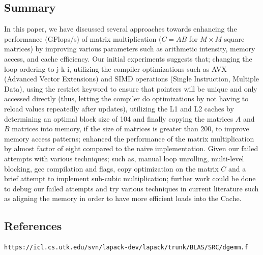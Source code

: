 \documentclass[12pt]{article}
\begin{document}
\subsection{Summary}

In this paper, we have discussed several approaches towards enhancing the performance (GFlops/s) of matrix multiplication ($C = AB$ for $M \times M$ square matrices) by improving various parameters such as arithmetic intensity, memory access, and cache efficiency. Our initial experiments suggests that; changing the loop ordering to j-k-i, utilizing the compiler optimizations such as AVX (Advanced Vector Extensions) and SIMD operations (Single Instruction, Multiple Data), using the restrict keyword to ensure that pointers will be unique and only accessed directly (thus, letting the compiler do optimizations by not having to reload values repeatedly  after updates), utilizing the L1 and L2 caches by determining an optimal block size of 104 and finally copying the matrices $A$ and $B$ matrices into memory, if the size of matrices is greater than 200, to improve memory access patterns; enhanced the performance of the matrix multiplication by almost factor of eight compared to the naive implementation. Given our failed attempts with various techniques; such as, manual loop unrolling, multi-level blocking, gcc compilation and flags, copy optimization on the matrix $C$  and a brief attempt to implement sub-cubic multiplication; further work could be done to debug our failed attempts and try various techniques in current literature such as aligning the memory in order to have more efficient loads into the Cache. 

\subsection{References}

\begin{verbatim}
https://icl.cs.utk.edu/svn/lapack-dev/lapack/trunk/BLAS/SRC/dgemm.f

\end{verbatim}
\end{document}
